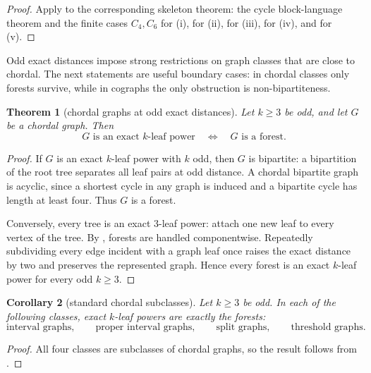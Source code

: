 \documentclass[11pt]{article}
\newtheorem{theorem}{Theorem}[section]
\newtheorem{corollary}[theorem]{Corollary}
\theoremstyle{definition}
\begin{document}
\begin{proof}
Apply  to the corresponding skeleton theorem: the cycle block-language theorem and the finite cases $C_4,C_6$ for (i),  for (ii),  for (iii),  for (iv), and  for (v).
\end{proof}

Odd exact distances impose strong restrictions on graph classes that are close to chordal.  The next statements are useful boundary cases: in chordal classes only forests survive, while in cographs the only obstruction is non-bipartiteness.

\begin{theorem}[chordal graphs at odd exact distances]\label{thm:chordal-odd}
Let $k\ge3$ be odd, and let $G$ be a chordal graph.  Then
\[
 G\text{ is an exact }k\text{-leaf power}
 \quad\Longleftrightarrow\quad
 G\text{ is a forest}.
\]
\end{theorem}

\begin{proof}
If $G$ is an exact $k$-leaf power with $k$ odd, then $G$ is bipartite: a bipartition of the root tree separates all leaf pairs at odd distance.  A chordal bipartite graph is acyclic, since a shortest cycle in any graph is induced and a bipartite cycle has length at least four.  Thus $G$ is a forest.

Conversely, every tree is an exact $3$-leaf power: attach one new leaf to every vertex of the tree.  By , forests are handled componentwise.  Repeatedly subdividing every edge incident with a graph leaf once raises the exact distance by two and preserves the represented graph.  Hence every forest is an exact $k$-leaf power for every odd $k\ge3$.
\end{proof}

\begin{corollary}[standard chordal subclasses]\label{cor:standard-chordal-subclasses}
Let $k\ge3$ be odd.  In each of the following classes, exact $k$-leaf powers are exactly the forests:
\[
 \text{interval graphs},\qquad
 \text{proper interval graphs},\qquad
 \text{split graphs},\qquad
 \text{threshold graphs}.
\]
\end{corollary}

\begin{proof}
All four classes are subclasses of chordal graphs, so the result follows from .
\end{proof}
\end{document}
